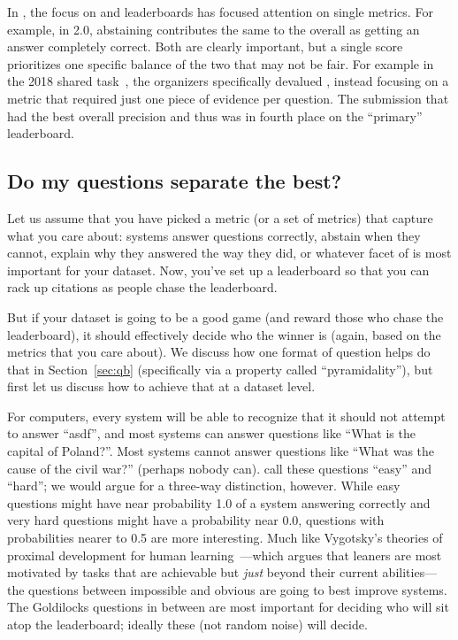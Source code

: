 In \qa{}, the focus on  and leaderboards has focused attention on single metrics.
For example, in \squad{} 2.0, abstaining contributes the same to the overall \fone{} as getting an answer completely correct.
Both are clearly important, but a single score prioritizes one specific balance of the two that may not be fair.
For example in the 2018 \fever{} shared task~\cite{fever-18}, the organizers specifically devalued \fone{}, instead focusing on a metric that required just one piece of evidence per question.
The submission that had the best overall precision and \fone{} thus was in fourth place on the ``primary'' leaderboard.

\subsection{Do my questions separate the best?}
\label{sec:discriminative}

Let us assume that you have picked a metric (or a set of metrics) that capture what you care about:
systems answer questions correctly,
abstain when they cannot,
explain why they answered the way they did,
or whatever facet of  is most important for your dataset.
Now, you've set up a leaderboard so that you can rack up citations as people chase the leaderboard.

But if your dataset is going to be a good game (and reward those who chase the leaderboard), it should effectively decide who the winner is (again, based on the metrics that you care about).
We discuss how one format of question helps do that in Section~\ref{sec:qb} (specifically via a property called ``pyramidality''), but first let us discuss how to achieve that at a dataset level.

For computers, every system will be able to recognize that it should not attempt to answer ``asdf'', and most systems can answer questions like ``What is the capital of Poland?''.
Most systems cannot answer questions like ``What was the cause of the  civil war?'' (perhaps nobody can).
 call these questions ``easy'' and ``hard''; we would argue for a three-way distinction, however.
While easy questions might have near probability 1.0 of a system answering correctly and very hard questions might have a probability near 0.0, questions with probabilities nearer to 0.5 are more interesting.
Much like Vygotsky's theories of proximal development for human learning~\cite{chaiklin-03}---which argues that leaners are most motivated by tasks that are achievable but \emph{just} beyond their current abilities---the questions between impossible and obvious are going to best improve  systems.
The Goldilocks questions in between are most important for deciding who will sit atop the leaderboard; ideally these (not random noise) will decide.

